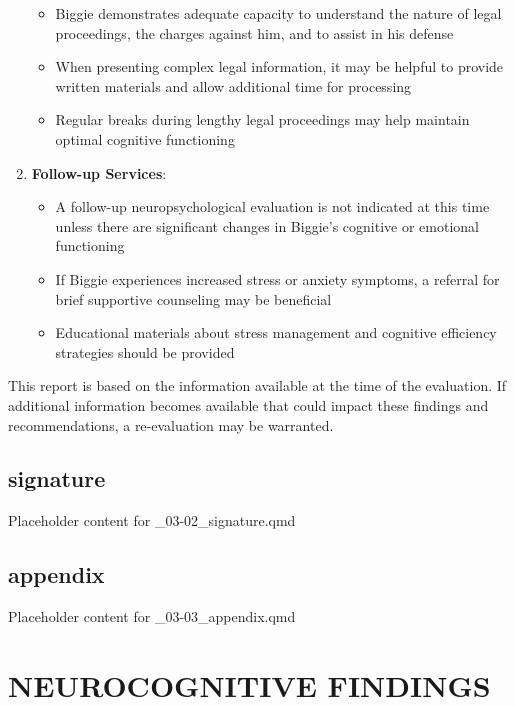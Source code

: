 \documentclass[
  letterpaper,
  DIV=11,
  numbers=noendperiod]{scrartcl}
\providecommand{\tightlist}{%
  \setlength{\itemsep}{0pt}\setlength{\parskip}{0pt}}
\begin{document}
\begin{enumerate}
  \begin{itemize}
  \tightlist
  \item
    Biggie demonstrates adequate capacity to understand the nature of
    legal proceedings, the charges against him, and to assist in his
    defense
  \item
    When presenting complex legal information, it may be helpful to
    provide written materials and allow additional time for processing
  \item
    Regular breaks during lengthy legal proceedings may help maintain
    optimal cognitive functioning
  \end{itemize}
\item
  \textbf{Follow-up Services}:

  \begin{itemize}
  \tightlist
  \item
    A follow-up neuropsychological evaluation is not indicated at this
    time unless there are significant changes in Biggie's cognitive or
    emotional functioning
  \item
    If Biggie experiences increased stress or anxiety symptoms, a
    referral for brief supportive counseling may be beneficial
  \item
    Educational materials about stress management and cognitive
    efficiency strategies should be provided
  \end{itemize}
\end{enumerate}

This report is based on the information available at the time of the
evaluation. If additional information becomes available that could
impact these findings and recommendations, a re-evaluation may be
warranted.

\subsection{signature}\label{signature}

Placeholder content for \_03-02\_signature.qmd

\subsection{appendix}\label{appendix}

Placeholder content for \_03-03\_appendix.qmd

\section{NEUROCOGNITIVE FINDINGS}\label{neurocognitive-findings}
\end{document}
